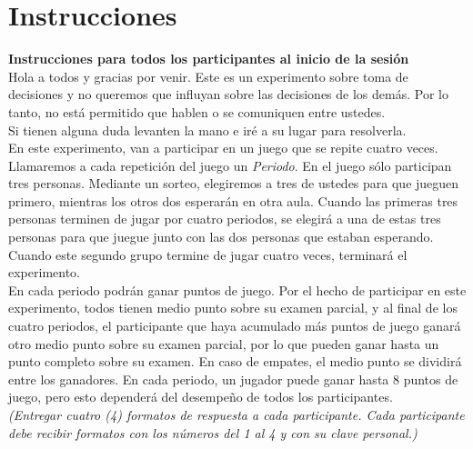 
\chapter{Instrucciones} %

\label{App_Inst} %

\textbf{Instrucciones para todos los participantes al inicio de la sesión}\\

Hola a todos y gracias por venir. Este es un experimento sobre toma de decisiones y no queremos que influyan sobre las decisiones de los demás. Por lo tanto, no está permitido que hablen o se comuniquen entre ustedes.\\

Si tienen alguna duda levanten la mano e iré a su lugar para resolverla.\\

En este experimento, van a participar en un juego que se repite cuatro veces. Llamaremos a cada repetición del juego un \textit{Periodo}. En el juego sólo participan tres personas. Mediante un sorteo, elegiremos a tres de ustedes para que jueguen primero, mientras los otros dos esperarán en otra aula. Cuando las primeras tres personas terminen de jugar por cuatro periodos, se elegirá a una de estas tres personas para que juegue junto con las dos personas que estaban esperando. Cuando este segundo grupo termine de jugar cuatro veces, terminará el experimento.\\

En cada periodo podrán ganar puntos de juego. Por el hecho de participar en este experimento, todos tienen medio punto sobre su examen parcial, y al final de los cuatro periodos, el participante que haya acumulado más puntos de juego ganará otro medio punto sobre su examen parcial, por lo que pueden ganar hasta un punto completo sobre su examen. En caso de empates, el medio punto se dividirá entre los ganadores. En cada periodo, un jugador puede ganar hasta 8 puntos de juego, pero esto dependerá del desempeño de todos los participantes.\\

\textit{(Entregar cuatro (4) formatos de respuesta a cada participante. Cada participante debe recibir formatos con los números del 1 al 4 y con su clave personal.)}\\

